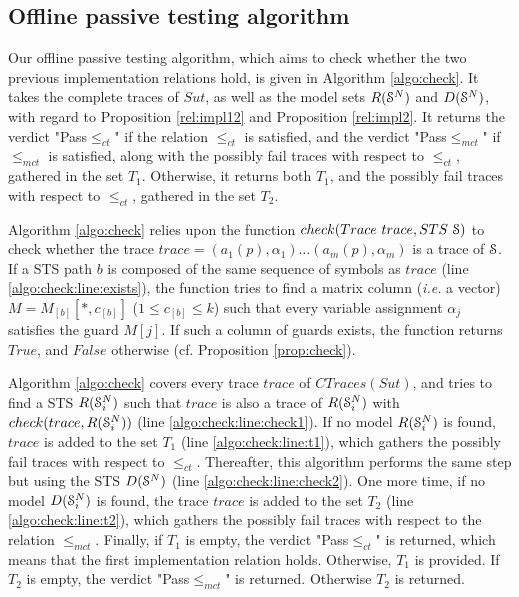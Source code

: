 \subsection{Offline passive testing algorithm}
\label{sec:testing:offline}

Our offline passive testing algorithm, which aims to check
whether the two previous implementation relations hold, is given
in Algorithm \ref{algo:check}. It takes the complete traces of
$\mathit{Sut}$, as well as the model sets $R(\EuScript{S}^{N})$ and
$D(\EuScript{S}^{N})$, with regard to Proposition
\ref{rel:impl12} and Proposition \ref{rel:impl2}. It returns the
verdict "Pass$\leq_{ct}$" if the relation $\leq_{ct}$ is
satisfied, and the verdict "Pass$\leq_{mct}$" if $\leq_{mct}$ is
satisfied, along with the possibly fail traces with respect to
$\leq_{ct}$, gathered in the set $T_1$. Otherwise, it returns
both $T_1$, and the possibly fail traces with respect to
$\leq_{ct}$, gathered in the set $T_2$.

Algorithm \ref{algo:check} relies upon the function ${check(Trace
~trace, STS ~\EuScript{S})}$ to check whether the trace $trace =
(a_1(p), \alpha_1) \dots (a_m(p), \alpha_m)$ is a trace of
$\EuScript{S}$. If a STS path $b$ is composed of the same
sequence of symbols as $trace$ (line
\ref{algo:check:line:exists}), the function tries to find a
matrix column (\emph{i.e.} a vector) $M = M_{[b]}[*,c_{[b]}]$ ($1
\leq c_{[b]} \leq k$) such that every variable assignment
$\alpha_j$ satisfies the guard $M[j]$. If such a column of guards
exists, the function returns $True$, and $False$ otherwise (cf.
Proposition \ref{prop:check}).

Algorithm \ref{algo:check} covers every trace $trace$ of
$CTraces({Sut})$, and tries to find a STS $R(\EuScript{S}_i^{N})$
such that $trace$ is also a trace of $R(\EuScript{S}_i^{N})$ with
$check(trace, R(\EuScript{S}_i^{N}))$ (line
\ref{algo:check:line:check1}).  If no model
$R(\EuScript{S}_i^{N})$ is found, $trace$ is added to the set
$T_1$ (line \ref{algo:check:line:t1}), which gathers the possibly
fail traces with respect to $\leq_{ct}$.
Thereafter, this algorithm performs the same step but using the
STS $D(\EuScript{S}^{N})$ (line \ref{algo:check:line:check2}).
One more time, if no model $D(\EuScript{S}_i^{N})$ is found, the
trace $trace$ is added to the set $T_2$ (line
\ref{algo:check:line:t2}), which gathers the possibly fail
traces with respect to the relation $\leq_{mct}$.
Finally, if $T_1$ is empty, the verdict "Pass$\leq_{ct}$" is
returned, which means that the first implementation relation
holds. Otherwise, $T_1$ is provided. If $T_2$ is empty, the
verdict "Pass$\leq_{mct}$" is returned. Otherwise $T_2$ is
returned.

